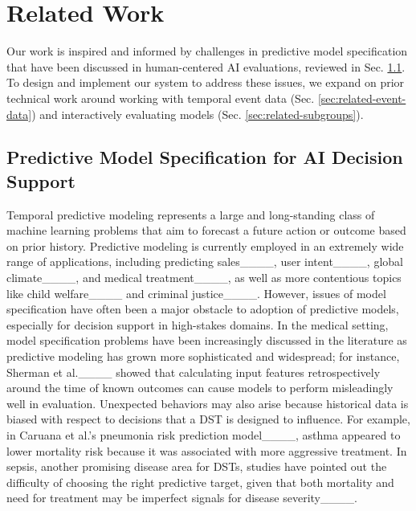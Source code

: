 \section{Related Work}
\label{sec:related-work}

Our work is inspired and informed by challenges in predictive model specification that have been discussed in human-centered AI evaluations, reviewed in Sec. \ref{sec:related-spec-issues}.
To design and implement our system to address these issues, we expand on prior technical work around working with temporal event data (Sec. \ref{sec:related-event-data}) and interactively evaluating models (Sec. \ref{sec:related-subgroups}).

\subsection{Predictive Model Specification for AI Decision Support}
\label{sec:related-spec-issues}

Temporal predictive modeling represents a large and long-standing class of machine learning problems that aim to forecast a future action or outcome based on prior history.
Predictive modeling is currently employed in an extremely wide range of applications, including predicting sales____, user intent____, global climate____, and medical treatment____, as well as more contentious topics like child welfare____ and criminal justice____.
However, issues of model specification have often been a major obstacle to adoption of predictive models, especially for decision support in high-stakes domains.
In the medical setting, model specification problems have been increasingly discussed in the literature as predictive modeling has grown more sophisticated and widespread; for instance, Sherman et al.____ showed that calculating input features retrospectively around the time of known outcomes can cause models to perform misleadingly well in evaluation.
Unexpected behaviors may also arise because historical data is biased with respect to decisions that a DST is designed to influence. For example, in Caruana et al.'s pneumonia risk prediction model____, asthma appeared to lower mortality risk because it was associated with more aggressive treatment.
In sepsis, another promising disease area for DSTs, studies have pointed out the difficulty of choosing the right predictive target, given that both mortality and need for treatment may be imperfect signals for disease severity____.

